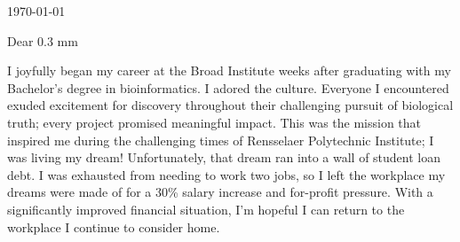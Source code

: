 \documentclass[10pt,letterpaper]{article}
\newcommand{\titleto}[1]{\renewcommand{\titleto}{#1}}
\newcommand{\nameto}[1]{\renewcommand{\nameto}{#1}}
\newcommand{\addrto}[1]{\renewcommand{\addrto}{#1}}
\begin{document}

\begin{flushright}

    \today
\end{flushright}


\nameto
\addrto


Dear \titleto \hspace{0.3 mm} \nameto,


I joyfully began my career at the Broad Institute weeks after graduating with my Bachelor’s degree in bioinformatics. I adored the culture. Everyone I encountered exuded excitement for discovery throughout their challenging pursuit of biological truth; every project promised meaningful impact. This was the mission that inspired me during the challenging times of Rensselaer Polytechnic Institute; I was living my dream! Unfortunately, that dream ran into a wall of student loan debt. I was exhausted from needing to work two jobs, so I left the workplace my dreams were made of for a 30\% salary increase and for-profit pressure. With a significantly improved financial situation, I'm hopeful I can return to the workplace I continue to consider home.
\end{document}
